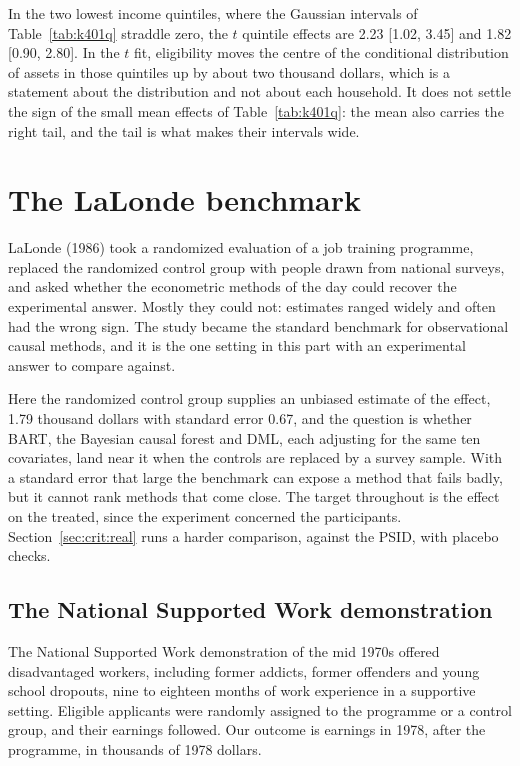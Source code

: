 In the two lowest income quintiles, where the Gaussian intervals of Table~\ref{tab:k401q} straddle zero, the $t$ quintile effects are 2.23 [1.02, 3.45] and 1.82 [0.90, 2.80]. In the $t$ fit, eligibility moves the centre of the conditional distribution of assets in those quintiles up by about two thousand dollars, which is a statement about the distribution and not about each household. It does not settle the sign of the small mean effects of Table~\ref{tab:k401q}: the mean also carries the right tail, and the tail is what makes their intervals wide.

\section{The LaLonde benchmark}\label{sec:lalonde}

LaLonde (1986) took a randomized evaluation of a job training programme, replaced the randomized control group with people drawn from national surveys, and asked whether the econometric methods of the day could recover the experimental answer. Mostly they could not: estimates ranged widely and often had the wrong sign. The study became the standard benchmark for observational causal methods, and it is the one setting in this part with an experimental answer to compare against.

Here the randomized control group supplies an unbiased estimate of the effect, 1.79 thousand dollars with standard error 0.67, and the question is whether BART, the Bayesian causal forest and DML, each adjusting for the same ten covariates, land near it when the controls are replaced by a survey sample. With a standard error that large the benchmark can expose a method that fails badly, but it cannot rank methods that come close. The target throughout is the effect on the treated, since the experiment concerned the participants. Section~\ref{sec:crit:real} runs a harder comparison, against the PSID, with placebo checks.

\subsection{The National Supported Work demonstration}

The National Supported Work demonstration of the mid 1970s offered disadvantaged workers, including former addicts, former offenders and young school dropouts, nine to eighteen months of work experience in a supportive setting. Eligible applicants were randomly assigned to the programme or a control group, and their earnings followed. Our outcome is earnings in 1978, after the programme, in thousands of 1978 dollars.


